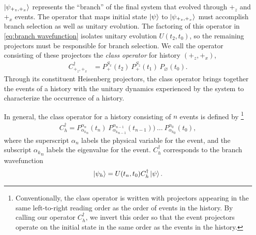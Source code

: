 $\ket{\psi_{+_z, +_x}}$ represents the ``branch'' of the final system that evolved through $+_z$ and $+_x$ events. The operator that maps initial state $\ket{\psi}$ to $\ket{\psi_{+_z, +_x}}$ must accomplish branch selection as well as unitary evolution. The factoring of this operator in \autoref{eq:branch wavefunction} isolates unitary evolution $U(t_2, t_0)$, so the remaining projectors must be responsible for branch selection. We call the operator consisting of these projectors the \textit{class operator} for history $\left(+_z, +_x\right)$,
\begin{align}
    C^\dagger_{+_z, +_x} &= {P^{S_x}_+(t_2)} \: {P^{S_z}_+(t_1)} \: {P_\varnothing(t_0)}.
\end{align}
Through its constituent Heisenberg projectors, the class operator brings together the events of a history with the unitary dynamics experienced by the system to characterize the occurrence of a history.

In general, the class operator for a history consisting of $n$ events is defined by \footnote{Conventionally, the class operator is written with projectors appearing in the same left-to-right reading order as the order of events in the history. By calling our operator $C_h^\dagger$, we invert this order so that the event projectors operate on the initial state in the same order as the events in the history.}
\begin{align}
  C_h^\dagger = P^{\alpha_n}_{{\alpha_k}_n}(t_n) \: P^{\alpha_{n-1}}_{{\alpha_k}_{n-1}}(t_{n-1})) \: ... \: P^{\alpha_0}_{{\alpha_k}_0}(t_0),
\end{align}
where the superscript $\alpha_n$ labels the physical variable for the event, and the subscript ${\alpha_k}_n$ labels the eigenvalue for the event. $C_h^\dagger$ corresponds to the branch wavefunction
\begin{align}
  \ket{\psi_h} = U(t_n, t_0) C_h^\dagger \ket{\psi}.
\end{align}

